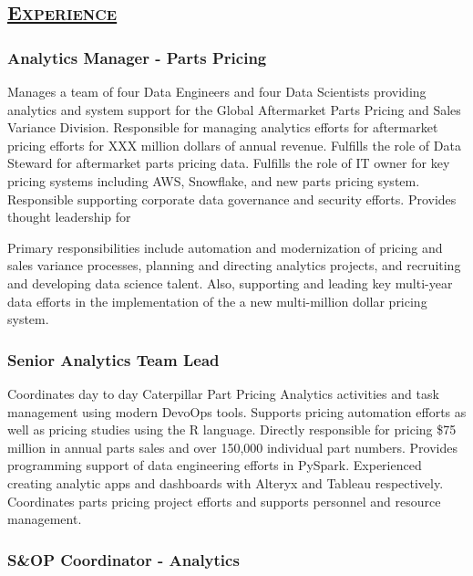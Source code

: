 \documentclass[
  letterpaper,
  DIV=11,
  numbers=noendperiod]{scrartcl}
\begin{document}
\hypertarget{experience}{%
\subsection{\texorpdfstring{\textsc{\uline{Experience}}}{Experience}}\label{experience}}

\hypertarget{analytics-manager---parts-pricing}{%
\subsubsection{Analytics Manager - Parts
Pricing}\label{analytics-manager---parts-pricing}}

Manages a team of four Data Engineers and four Data Scientists providing
analytics and system support for the Global Aftermarket Parts Pricing
and Sales Variance Division. Responsible for managing analytics efforts
for aftermarket pricing efforts for XXX million dollars of annual
revenue. Fulfills the role of Data Steward for aftermarket parts pricing
data. Fulfills the role of IT owner for key pricing systems including
AWS, Snowflake, and new parts pricing system. Responsible supporting
corporate data governance and security efforts. Provides thought
leadership for

Primary responsibilities include automation and modernization of pricing
and sales variance processes, planning and directing analytics projects,
and recruiting and developing data science talent. Also, supporting and
leading key multi-year data efforts in the implementation of the a new
multi-million dollar pricing system.

\hypertarget{senior-analytics-team-lead}{%
\subsubsection{Senior Analytics Team
Lead}\label{senior-analytics-team-lead}}

Coordinates day to day Caterpillar Part Pricing Analytics activities and
task management using modern DevoOps tools. Supports pricing automation
efforts as well as pricing studies using the R language. Directly
responsible for pricing \$75 million in annual parts sales and over
150,000 individual part numbers. Provides programming support of data
engineering efforts in PySpark. Experienced creating analytic apps and
dashboards with Alteryx and Tableau respectively. Coordinates parts
pricing project efforts and supports personnel and resource management.

\hypertarget{sop-coordinator---analytics}{%
\subsubsection{S\&OP Coordinator -
Analytics}\label{sop-coordinator---analytics}}
\end{document}
